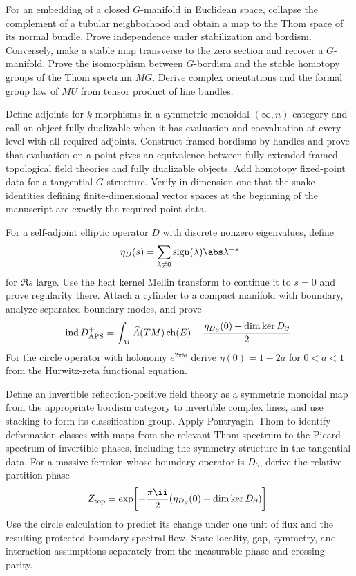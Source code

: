 \begin{exercise}
For an embedding of a closed $G$-manifold in Euclidean space, collapse the
complement of a tubular neighborhood and obtain a map to the Thom space of
its normal bundle.  Prove independence under stabilization and bordism.
Conversely, make a stable map transverse to the zero section and recover a
$G$-manifold.  Prove the isomorphism between $G$-bordism and the stable
homotopy groups of the Thom spectrum $MG$.  Derive complex orientations and
the formal group law of $MU$ from tensor product of line bundles.
\end{exercise}

\begin{exercise}
Define adjoints for $k$-morphisms in a symmetric monoidal
$(\infty,n)$-category and
call an object fully dualizable when it has evaluation and coevaluation at
every level with all required adjoints.  Construct framed bordisms by handles
and prove that evaluation on a point gives an equivalence between fully
extended framed topological field theories and fully dualizable objects.
Add homotopy fixed-point data for a tangential $G$-structure.  Verify in
dimension one that the snake identities defining finite-dimensional vector
spaces at the beginning of the manuscript are exactly the required point
data.
\end{exercise}

\begin{exercise}
For a self-adjoint elliptic operator $D$ with discrete nonzero eigenvalues,
define
\[
 \eta_D(s)=\sum_{\lambda\ne0}\operatorname{sign}(\lambda)\abs\lambda^{-s}
\]
for $\Re s$ large.  Use the heat kernel Mellin transform to continue it to
$s=0$ and prove regularity there.  Attach a cylinder to a compact manifold
with boundary, analyze separated boundary modes, and prove
\[
 \operatorname{ind}D^+_{\rm APS}
 =\int_M\widehat A(TM)\operatorname{ch}(E)
 -\frac{\eta_{D_\partial}(0)+\dim\ker D_\partial}{2}.
\]
For the circle operator with holonomy $e^{2\pi\ii a}$ derive
$\eta(0)=1-2a$ for $0<a<1$ from the Hurwitz-zeta functional equation.
\end{exercise}

\begin{exercise}
Define an invertible reflection-positive field theory as a symmetric
monoidal map from the appropriate bordism category to invertible complex
lines, and use stacking to form its classification group.  Apply
Pontryagin--Thom to identify deformation classes with maps from the relevant
Thom spectrum to the Picard spectrum of invertible phases, including the
symmetry structure in the tangential data.  For a
massive fermion whose boundary operator is $D_\partial$, derive the relative
partition phase
\[
 Z_{\rm top}=\exp\!\left[-\frac{\pi\ii}{2}
 (\eta_{D_\partial}(0)+\dim\ker D_\partial)\right].
\]
Use the circle calculation to predict its change under one unit of flux and
the resulting protected boundary spectral flow.  State locality, gap,
symmetry, and interaction assumptions separately from the measurable phase
and crossing parity.
\end{exercise}

